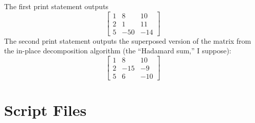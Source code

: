 \documentclass{article}
\begin{document}
\section{}
The first print statement outputs
\[\begin{bmatrix}
    1 & 8 & 10\\
    2 & 1 & 11\\
    5 & -50 & -14
  \end{bmatrix}\]
The second print statement outputs the superposed version of the matrix from the in-place decomposition algorithm (the ``Hadamard sum,'' I suppose):
\[\begin{bmatrix}
    1 & 8 & 10 \\
    2 & -15 & -9 \\
    5 & 6 & -10
  \end{bmatrix}\]
\section*{Script Files}
\begin{verbatim}

\end{verbatim}
\end{document}
